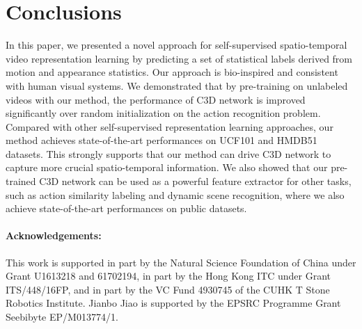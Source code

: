 \documentclass[10pt,twocolumn,letterpaper]{article}
\begin{document}
\section{Conclusions}

In this paper, we presented a novel approach for self-supervised spatio-temporal video representation learning by predicting a set of statistical labels derived from motion and appearance statistics. Our approach is bio-inspired and consistent with human visual systems. We demonstrated that by pre-training on unlabeled videos with our method, the performance of C3D network is improved significantly over random initialization on the action recognition problem. Compared with other self-supervised representation learning approaches, our method achieves state-of-the-art performances on UCF101 and HMDB51 datasets. 
This strongly supports that our method can drive C3D network to capture more crucial spatio-temporal information. We also showed that our pre-trained C3D network can be used as a powerful feature extractor for other tasks, such as action similarity labeling and dynamic scene recognition, where we also achieve state-of-the-art performances on public datasets. 




\vspace{-3mm}
\paragraph{Acknowledgements:} This work is supported in part by the Natural Science Foundation of China under Grant U1613218 and 61702194, in part by the Hong Kong ITC under Grant ITS/448/16FP, and in part by the VC Fund 4930745 of the CUHK T Stone Robotics Institute. Jianbo Jiao is supported by the EPSRC Programme Grant Seebibyte EP/M013774/1.
\end{document}
